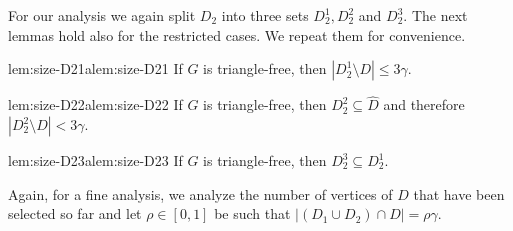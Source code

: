 For our analysis we again split $D_2$ into three sets $D_2^1, D_2^2$ and
$D_2^3$. The next lemmas hold also for the restricted cases. We repeat
them for convenience.

\begin{adapted}{lem:size-D21}{alem:size-D21}
  If $G$ is triangle-free, then $|D_2^1\setminus D|\leq 3\gamma$.
\end{adapted}

\begin{adapted}{lem:size-D22}{alem:size-D22}
  If $G$ is triangle-free, then $D_2^2 \subseteq \hat D$ and therefore
  $|D_2^2\setminus D|< 3\gamma$.
\end{adapted}

\begin{adapted}{lem:size-D23}{alem:size-D23}
  If $G$ is triangle-free, then $D_2^3\subseteq D_2^1$.
\end{adapted}

Again, for a fine analysis, we
analyze the number of vertices of $D$ that have been selected
so far and let $\rho\in [0,1]$ be such that $|(D_1\cup D_2)\cap D| =\rho\gamma$.

